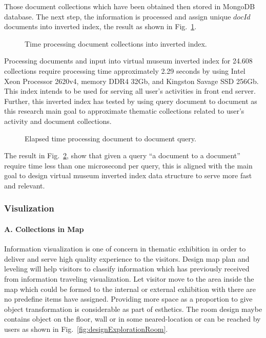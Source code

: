 Those document collections which have been obtained then stored in MongoDB database. The next step, the information is processed and assign unique \(\textit{docId}\) documents into inverted index, the result as shown in Fig.~\cref{fig:timeProcessingInvertedIndex}.

\begin{figure}[ht]
	\caption{Time processing document collections into inverted index.}\label{fig:timeProcessingInvertedIndex}
\end{figure}

Processing documents and input into virtual museum inverted index for 24.608 collections require processing time approximately 2.29 seconds by using Intel Xeon Processor 2620v4, memory DDR4 32Gb, and Kingston Savage SSD 256Gb. This index intends to be used for serving all user’s activities in front end server. Further, this inverted index has tested by using query document to document as this research main goal to approximate thematic collections related to user’s activity and document collections.

\begin{figure}[ht]
	\caption{Elapsed time processing document to document query.}\label{fig:timeProcessingDocumentQuery}
\end{figure}

The result in Fig.~\cref{fig:timeProcessingDocumentQuery}, show that given a query “a document to a document” require time less than one microsecond per query, this is aligned with the main goal to design virtual museum inverted index data structure to serve more fast and relevant.

\subsubsection{Visulization}
\paragraph{A. Collections in Map}
Information visualization is one of concern in thematic exhibition in order to deliver and serve high quality experience to the visitors.
Design map plan and leveling will help visitors to classify information which has previously received from information traveling visualization. Let visitor move to the area inside the map which could be formed to the internal or external exhibition with there are no predefine items have assigned. Providing more space as a proportion to give object transformation is considerable as part of esthetics. The room design maybe contains object on the floor, wall or in some neared-location or can be reached by users as shown in Fig.~\cref{fig:designExplorationRoom}.

